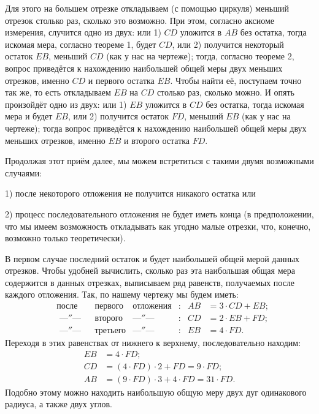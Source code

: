 \documentclass[oneside]{book}
\begin{document}
Для этого на большем отрезке откладываем (с помощью циркуля) меньший отрезок столько раз, сколько это возможно.
При этом, согласно аксиоме измерения, случится одно из двух:
или 
1) $CD$ уложится в $AB$ без остатка, тогда искомая мера, согласно теореме 1, будет $CD$, 
или 2) получится некоторый остаток $EB$, меньший $CD$ (как у нас на чертеже);
тогда, согласно теореме 2, вопрос приведётся к нахождению наибольшей общей меры двух меньших отрезков, именно $CD$ и первого остатка $EB$.
Чтобы найти её, поступаем точно так же, то есть откладываем $EB$ на $CD$ столько раз, сколько можно.
И опять произойдёт одно из двух:
или 1) $EB$ уложится в $CD$ без остатка, тогда искомая мера и будет $EB$, 
или 2) получится остаток $FD$, меньший $EB$ (как у нас на чертеже);
тогда вопрос приведётся к нахождению наибольшей общей меры двух меньших отрезков, именно $EB$ и второго остатка $FD$.

Продолжая этот приём далее, мы можем встретиться с такими двумя возможными случаями:

1) после некоторого отложения не получится никакого остатка или

2) процесс последовательного отложения не будет иметь конца (в предположении, что мы имеем возможность откладывать как угодно малые отрезки, что, конечно, возможно только теоретически).

В первом случае последний остаток и будет наибольшей общей мерой данных отрезков.
Чтобы удобней вычислить, сколько раз эта наибольшая общая мера содержится в данных отрезках, выписываем ряд равенств, получаемых после каждого отложения.
Так, по нашему чертежу мы будем иметь:
\begin{align*}
&\text{после}
&&\text{первого}
&\text{отложения}&:
&AB &= 3\cdot CD + EB;
\\
&\text{\ —″—}
&&\text{второго}
&\text{—″—\ \ \ \ }&:
&CD &= 2\cdot EB + FD;
\\
&\text{\ —″—}
&&\text{третьего}
&\text{—″—\ \ \ \ }&:
&EB &= 4\cdot FD.
\end{align*}
Переходя в этих равенствах от нижнего к верхнему, последовательно находим:
\begin{align*}
EB&=4\cdot FD;
\\
CD&=(4\cdot FD)\cdot 2+FD=9\cdot FD;
\\
AB&=(9\cdot FD)\cdot 3+4\cdot FD=31\cdot FD.
\end{align*}
Подобно этому можно находить наибольшую общую меру двух дуг одинакового радиуса, а также двух углов.
\end{document}
